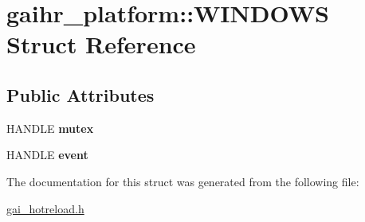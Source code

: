 \hypertarget{structgaihr__platform_1_1_w_i_n_d_o_w_s}{}\section{gaihr\+\_\+platform\+:\+:W\+I\+N\+D\+O\+WS Struct Reference}
\label{structgaihr__platform_1_1_w_i_n_d_o_w_s}
\subsection*{Public Attributes}
\begin{DoxyCompactItemize}
\item 
\mbox{\label{structgaihr__platform_1_1_w_i_n_d_o_w_s_a9c196ea55660ecbcf7b107b3632e6668}} 
H\+A\+N\+D\+LE {\bfseries mutex}
\item 
\mbox{\label{structgaihr__platform_1_1_w_i_n_d_o_w_s_a7ae38d818427a282719e1a9057ce40a7}} 
H\+A\+N\+D\+LE {\bfseries event}
\end{DoxyCompactItemize}


The documentation for this struct was generated from the following file\+:\begin{DoxyCompactItemize}
\item 
\hyperlink{gai__hotreload_8h}{gai\+\_\+hotreload.\+h}\end{DoxyCompactItemize}
